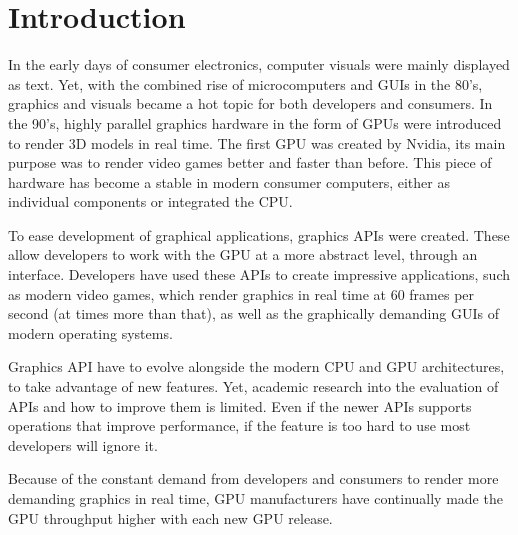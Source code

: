 \chapter{Introduction}\label{ch:introduction}
In the early days of consumer electronics, computer visuals were mainly displayed as text.
Yet, with the combined rise of microcomputers and \glspl{GUI} in the 80's, graphics and visuals became a hot topic for both developers and consumers.  
In the 90's, highly parallel graphics hardware in the form of GPUs were introduced to render 3D models in real time.
The first GPU was created by Nvidia, its main purpose was to render video games better and faster than before.
This piece of hardware has become a stable in modern consumer computers, either as individual components or integrated the CPU.

To ease development of graphical applications, graphics \glspl{API} were created. 
These allow developers to work with the GPU at a more abstract level, through an interface.
Developers have used these \glspl{API} to create impressive applications, such as modern video games, which render graphics in real time at 60 frames per second (at times more than that), as well as the graphically demanding \glspl{GUI} of modern operating systems.

Graphics \gls{API} have to evolve alongside the modern CPU and GPU architectures, to take advantage of new features. 
Yet, academic research into the evaluation of \glspl{API} and how to improve them is limited.
Even if the newer \glspl{API} supports operations that improve performance, if the feature is too hard to use most developers will ignore it.

Because of the constant demand from developers and consumers to render more demanding graphics in real time, \gls{GPU} manufacturers have continually made the GPU throughput higher with each new \gls{GPU} release.

